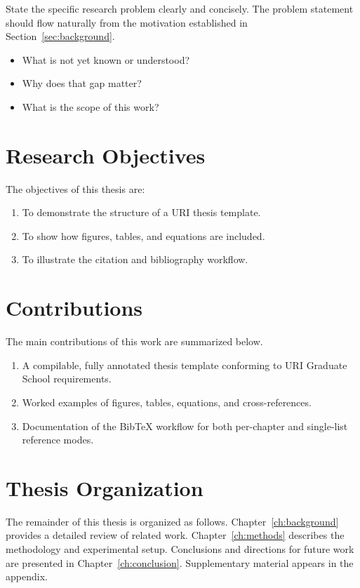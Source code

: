 State the specific research problem clearly and concisely.
The problem statement should flow naturally from the motivation
established in Section~\ref{sec:background}.

\begin{itemize}
  \item What is not yet known or understood?
  \item Why does that gap matter?
  \item What is the scope of this work?
\end{itemize}

\section{Research Objectives}
\label{sec:objectives}

The objectives of this thesis are:
\begin{enumerate}
  \item To demonstrate the structure of a URI thesis template.
  \item To show how figures, tables, and equations are included.
  \item To illustrate the citation and bibliography workflow.
\end{enumerate}

\section{Contributions}
\label{sec:contributions}

The main contributions of this work are summarized below.

\begin{enumerate}
  \item A compilable, fully annotated thesis template conforming to URI
        Graduate School requirements.
  \item Worked examples of figures, tables, equations, and cross-references.
  \item Documentation of the BibTeX workflow for both per-chapter and
        single-list reference modes.
\end{enumerate}

\section{Thesis Organization}
\label{sec:organization}

The remainder of this thesis is organized as follows.
Chapter~\ref{ch:background} provides a detailed review of related work.
Chapter~\ref{ch:methods} describes the methodology and experimental setup.
Conclusions and directions for future work are presented in
Chapter~\ref{ch:conclusion}.
Supplementary material appears in the appendix.
